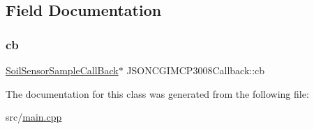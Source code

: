 \subsection{Field Documentation}
\mbox{\label{classJSONCGIMCP3008Callback_a2bfea06cf990c5ed9b3d2180a8c9996e}} 
\subsubsection{\texorpdfstring{cb}{cb}}
{\footnotesize\ttfamily \hyperlink{classSoilSensorSampleCallBack}{Soil\+Sensor\+Sample\+Call\+Back}$\ast$ J\+S\+O\+N\+C\+G\+I\+M\+C\+P3008\+Callback\+::cb\hspace{0.3cm}{\ttfamily [private]}}



The documentation for this class was generated from the following file\+:\begin{DoxyCompactItemize}
\item 
src/\hyperlink{main_8cpp}{main.\+cpp}\end{DoxyCompactItemize}
